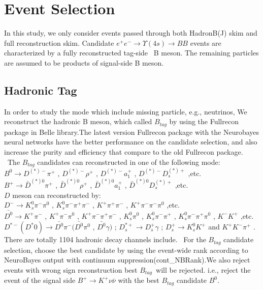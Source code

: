 \section{Event Selection}
In this study, we only consider events passed through both HadronB(J) skim and full reconstruction skim.
Candidate $e^+ e^- \rightarrow \Upsilon(4s) \rightarrow B B $ events are characterized by a fully reconstructed tag-side \
B meson. The remaining particles are assumed to be products of signal-side B meson.
\subsection{Hadronic Tag}
In order to study the mode which include missing particle, e.g., neutrinos, We reconstruct the hadronic B meson, which called $B_{tag}$ by using the Fullrecon package in Belle library.The latest version Fullrecon package with the Neurobayes neural networks\cite{ref:Feindt2011} have the better performance on the candidate selection, and also increase the purity and efficiency that compare to the old Fullrecon package. \
The $B_{tag}$ candidates can reconstructed in one of the following mode:\\
$B^0 \rightarrow D^{(*)-} \pi^+ $ , $ D^{(*)-} \rho^+$ , $ D^{(*)-}a^+_1$ , $ D^{(*)-} D^{(*)+}_s$ ,etc.\\
$B^+ \rightarrow\bar{D}^{(*)0} \pi^+$ , $ \bar{D}^{(*)0} \rho^+$ , $ \bar{D}^{(*)0}a^+_1$ , $ \bar{D}^{(*)0} D^{(*)+}_s$ ,etc.\\
$D$ meson can reconstructed by:\\
$D^- \rightarrow K^0_s \pi^- \pi^0$ , $K^0_s \pi^- \pi^+ \pi^-$ , $K^+ \pi^+ \pi^-$ , $K^+  \pi^- \pi^-\pi^0$ ,etc. \\
\vspace*{1mm}
$\bar{D^0} \rightarrow K^+ \pi^-$ , $K^+ \pi^- \pi^0$ , $K^+ \pi^- \pi^+ \pi^-$ , $K^0_s \pi^0$ , $K^0_s \pi^- \pi^+$ , $K^0_s \pi^- \pi^+ \pi^0$ , $K^- K^+$ ,etc. \\
\vspace*{1mm}
$D^{*-}(D^*0) \rightarrow \bar{D^0} \pi^-(\bar{D^0} \pi^0$ , $ \bar{D^0} \gamma)$ ; $D^{*+}_s \rightarrow D^+_s \gamma$ ; $D^+_s \rightarrow K^0_s K^+$ and $K^+ K^- \pi^+$ .\\
\vspace*{2mm}
There are totally 1104 hadronic decay channels include. \
For the $B_{tag}$ candidate selection, choose the best candidate by using the event-wide rank according to NeuroBayes output with continuum suppression(cont\_NBRank).We also reject events with wrong sign reconstruction best $B_{tag}$\
will be rejected. i.e., reject the event of the signal side $B^+ \rightarrow K^+ \nu \bar{\nu}$ with the best $B_{tag}$ candidate $B^0$.  

